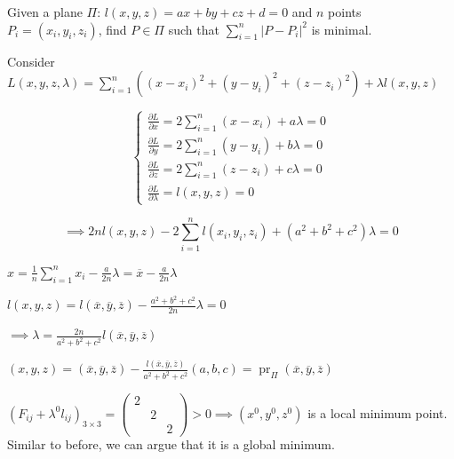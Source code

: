 \begin{example}
    Given a plane $\Pi:\,l(x,y,z)=ax+by+cz+d=0$ and $n$ points $P_i=(x_i,y_i,z_i)$, find $P\in\Pi$ such that $\sum_{i=1}^n|P-P_i|^2$ is minimal.

    Consider $L(x,y,z,\lambda)=\sum_{i=1}^n((x-x_i)^2+(y-y_i)^2+(z-z_i)^2)+\lambda l(x,y,z)$

    $$\begin{cases}
            \frac{\partial L}{\partial x}=2\sum_{i=1}^n(x-x_i)+a\lambda=0 \\
            \frac{\partial L}{\partial y}=2\sum_{i=1}^n(y-y_i)+b\lambda=0 \\
            \frac{\partial L}{\partial z}=2\sum_{i=1}^n(z-z_i)+c\lambda=0 \\
            \frac{\partial L}{\partial\lambda}=l(x,y,z)=0
        \end{cases}$$

    $$\implies 2nl(x,y,z)-2\sum_{i=1}^nl(x_i,y_i,z_i)+(a^2+b^2+c^2)\lambda=0$$

    $x=\frac{1}{n}\sum_{i=1}^n x_i-\frac{a}{2n}\lambda=\overline{x}-\frac{a}{2n}\lambda$

    $l(x,y,z)=l(\overline{x},\overline{y},\overline{z})-\frac{a^2+b^2+c^2}{2n}\lambda=0$

    $\implies\lambda=\frac{2n}{a^2+b^2+c^2}l(\overline{x},\overline{y},\overline{z})$

    $(x,y,z)=(\overline{x},\overline{y},\overline{z})-\frac{l(\overline{x},\overline{y},\overline{z})}{a^2+b^2+c^2}(a,b,c)=\operatorname{pr}_\Pi(\overline{x},\overline{y},\overline{z})$

    $\left(F_{ij}+\lambda^0l_{ij}\right)_{3\times 3}=\begin{pmatrix}
            2 &   &   \\
              & 2 &   \\
              &   & 2
        \end{pmatrix}>0\implies(x^0,y^0,z^0)$ is a local minimum point. Similar to before, we can argue that it is a global minimum.
\end{example}


